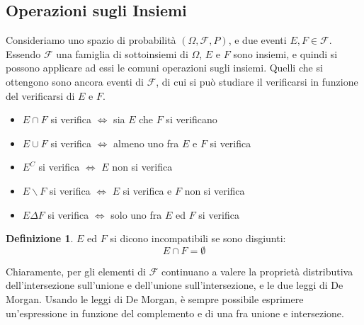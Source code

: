 \documentclass{article}
\theoremstyle{plain}
\theoremstyle{definition}
\newtheorem{definizione}{Definizione}[section]
\theoremstyle{remark}
\begin{document}
\subsection{Operazioni sugli Insiemi} %
\label{sub:operazioni_sugli_insiemi}
Consideriamo uno spazio di probabilità $(\Omega,\mathcal{F},P)$, e due eventi $E,F\in\mathcal{F}$. Essendo $\mathcal{F}$ una famiglia di sottoinsiemi di $\Omega$, $E$ e $F$ sono insiemi, e quindi si possono applicare ad essi le comuni operazioni sugli insiemi. Quelli che si ottengono sono ancora eventi di $\mathcal{F}$, di cui si può studiare il verificarsi in funzione del verificarsi di $E$ e $F$.
\begin{itemize}
	\item $E\cap F$ si verifica $\Leftrightarrow$ sia $E$ che $F$ si verificano
	\item $E\cup F$ si verifica $\Leftrightarrow$ almeno uno fra $E$ e $F$ si verifica
	\item $E^C$ si verifica $\Leftrightarrow$ $E$ non si verifica
	\item $E\smallsetminus F$ si verifica $\Leftrightarrow$ $E$ si verifica e $F$ non si verifica
	\item $E\Delta F$ si verifica $\Leftrightarrow$ solo uno fra $E$ ed $F$ si verifica
\end{itemize}
\begin{definizione}
	$E$ ed $F$ si dicono incompatibili se sono disgiunti:
	\begin{equation*}
		E\cap F=\emptyset
	\end{equation*}
\end{definizione}
Chiaramente, per gli elementi di $\mathcal{F}$ continuano a valere la proprietà distributiva dell'intersezione sull'unione e dell'unione sull'intersezione, e le due leggi di De Morgan. Usando le leggi di De Morgan, è sempre possibile esprimere un'espressione in funzione del complemento e di una fra unione e intersezione.
\end{document}
